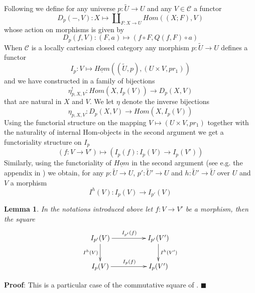 \documentclass[12pt]{article}
\numberwithin{equation}{section}
\newenvironment{myproof}{{\bf Proof}:}{$\blacksquare$ \vskip 5mm }
\newtheorem{lemma}[proposition]{Lemma}
\newcommand{\llabel}[1]{\label{#1}}
\newcommand{\sr}{\rightarrow}
\newcommand{\uu}{\underline}
\newcommand{\wt}{\widetilde}
\begin{document}
Following \cite{fromunivwithPi} we define for any universe $p:\wt{U}\sr U$ and
any $V\in {\mathcal C}$ a functor
%
$$D_p(-,V):X\mapsto \amalg_{F:X\sr U}Hom((X;F), V)$$
%
whose action on morphisms is given by
%
$$D_p(f,V):(F,a)\mapsto (f\circ F, Q(f,F)\circ a)$$
%
When $\mathcal C$ is a locally cartesian closed category any morphism
$p:\wt{U}\sr U$ defines a functor
%
$$I_p:V\mapsto \uu{Hom}((\wt{U},p),(U\times V,pr_1))$$
%
and we have constructed in \cite[Construction 3.9]{fromunivwithPi} a family of
bijections
%
$$\eta^!_{p,X,V}:Hom(X,I_p(V))\sr D_p(X,V)$$
%
that are natural in $X$ and $V$. We let $\eta$ denote the inverse bijections
%
$$\eta_{p,X,V}:D_p(X,V)\sr Hom(X,I_p(V))$$
%
Using the functorial structure on the mapping $V\mapsto (U\times V,pr_1)$
together with the naturality of internal Hom-objects in the second argument we
get a functoriality structure on $I_p$
%
$$(f:V\sr V')\mapsto (I_p(f):I_p(V)\sr I_p(V'))$$
%
Similarly, using the functoriality of $\uu{Hom}$ in the second argument (see
e.g. the appendix in \cite{fromunivwithPi}) we obtain, for any $p:\wt{U}\sr U$,
$p':\wt{U}'\sr U$ and $h:\wt{U}'\sr \wt{U}$ over $U$ and $V$ a morphism
%
$$I^h(V):I_p(V)\sr I_{p'}(V)$$
%
\begin{lemma}
\llabel{2015.04.10.l2} In the notations introduced above let $f:V\sr V'$ be a
morphism, then the square
%
$$
\begin{xy}
          \xymatrix@C=4pc{ I_{p'}(V) \ar[r]^{I_{p'}(f)} \ar[d]_{I^h(V)} &
            I_{p'}(V') \ar[d]^{I^h(V')}\\ I_p(V) \ar[r]^{I_p(f)} & I_p(V') }
\end{xy}
$$
\end{lemma}
%
\begin{myproof}
This is a particular case of the commutative square of \cite[Lemma
  8.5]{fromunivwithPi}.
\end{myproof}
\end{document}
